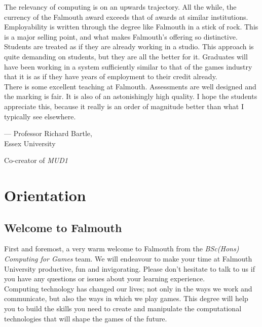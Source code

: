 \documentclass[10pt, a5paper, twoside, openright, titlepage]{memoir}\usepackage{etoolbox}\newtoggle{printable}\toggletrue{printable}\newtoggle{isBeamer}\togglefalse{isBeamer}
\begin{document}
The relevancy of computing is on an upwards trajectory. All the while, the currency of the Falmouth award exceeds that of awards at similar institutions. \\

Employability is written through the degree like Falmouth in a stick of rock. This is a major selling point, and what makes Falmouth's offering so distinctive. Students are treated as if they are already working in a studio. This approach is quite demanding on students, but they are all the better for it. Graduates will have been working in a system sufficiently similar to that of the games industry that it is as if they have years of employment to their credit already. \\

There is some excellent teaching at Falmouth. Assessments are well designed and the marking is fair. It is also of an astonishingly high quality. I hope the students appreciate this, because it really is an order of magnitude better than what I typically see elsewhere.

\bigskip

\begin{flushright}

--- Professor Richard Bartle, \\
Essex University

\bigskip

Co-creator of \textit{MUD1}
\end{flushright}

\mainmatter

\chapter{Orientation}
\newpage

\section{Welcome to Falmouth}

First and foremost, a very warm welcome to Falmouth from the \textit{BSc(Hons) Computing for Games} team. We will endeavour to make your time at Falmouth University productive, fun and invigorating. Please don't hesitate to talk to us if you have any questions or issues about your learning experience. \\

Computing technology has changed our lives; not only in the ways we work and communicate, but also the ways in which we play games. This degree will help you to build the skills you need to create and manipulate the computational technologies that will shape the games of the future. \\
\end{document}
